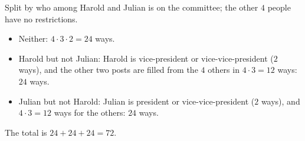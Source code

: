 Split by who among Harold and Julian is on the committee; the other $4$ people have no restrictions.
\begin{itemize}
\item Neither: $4\cdot3\cdot2=24$ ways.
\item Harold but not Julian: Harold is vice-president or vice-vice-president ($2$ ways), and the other two posts are filled from the $4$ others in $4\cdot3=12$ ways: $24$ ways.
\item Julian but not Harold: Julian is president or vice-vice-president ($2$ ways), and $4\cdot3=12$ ways for the others: $24$ ways.
\end{itemize}
The total is $24+24+24=\boxed{72}$.
